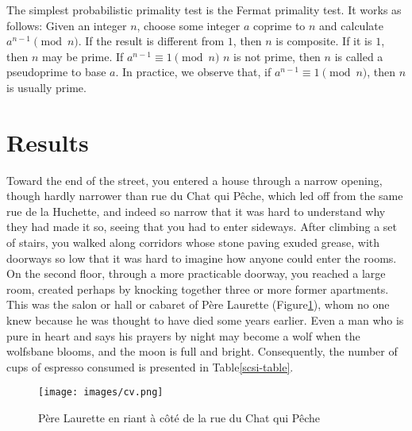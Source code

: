 \documentclass[11pt]{article}
\begin{document}
The simplest probabilistic primality test is the Fermat primality
test. It works as follows: Given an integer $n$, choose some integer
$a$ coprime to $n$ and calculate $a^{n - 1} \pmod{n}$. If the result
is different from $1$, then $n$ is composite. If it is $1$, then
$n$ may be prime. If $a^{n-1} \equiv 1 \pmod{n}$ $n$ is not prime,
then $n$ is called a pseudoprime to base $a$. In practice, we
observe that, if $a^{n-1} \equiv 1 \pmod{n}$, then $n$ is usually
prime.

\section{Results}\label{ss:result}

Toward the end of the street, you entered a house through a narrow
opening, though hardly narrower than rue du Chat qui P\^{e}che, which
led off from the same rue de la Huchette, and indeed so narrow that
it was hard to understand why they had made it so, seeing that you
had to enter sideways. After climbing a set of stairs, you walked
along corridors whose stone paving exuded grease, with doorways so
low that it was hard to imagine how anyone could enter the rooms.
On the second floor, through a more practicable doorway, you reached
a large room, created perhaps by knocking together three or more
former apartments. This was the salon or hall or cabaret of P\`{e}re
Laurette (Figure\xspace\ref{pere}), whom no one knew because he was thought to have died some
years earlier.
Even a man who is pure in heart and says his prayers by night may become a wolf when the wolfsbane blooms, and the moon is full and bright.
Consequently, the number of cups of espresso consumed is presented in Table\xspace\ref{scsi-table}.

\begin{figure}[tbh]
        \centering
        \texttt{[image: images/cv.png]}
        \caption{P\`ere Laurette en riant \`a c\^ot\'e de la rue du Chat qui P\^{e}che}\label{pere}
\end{figure}
\end{document}
